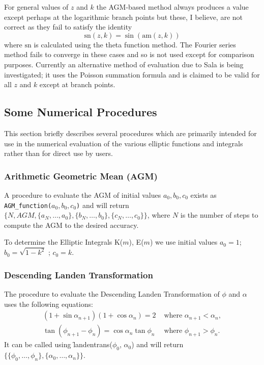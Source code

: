 For general values of $z$ and $k$ the AGM-based method always produces a value
except perhaps at the logarithmic branch points but these, I believe, are
not correct as they fail to satisfy the identity
\[\mathrm{sn}(z,k) = \sin(\mathrm{am}(z,k)) \]
where $\mathrm{sn}$ is calculated using the theta function method. The Fourier
series method fails to converge in these cases and so is not used except for
comparison purposes.  Currently an alternative method of evaluation due to
Sala is being investigated; it uses the Poisson summation formula and is claimed
to be valid for all $z$ and $k$ except at branch points.

\subsection{Some Numerical Procedures}
This section briefly describes several procedures which are primarily
intended for use in the numerical evaluation of the various elliptic
functions and integrals rather than for direct use by users.

\subsubsection{Arithmetic Geometric Mean (AGM)}
\hypertarget{operator:AGM_FUNCTION}{}
A procedure to evaluate the AGM of initial values \(a_0,b_0,c_0\)
exists as \\
\texttt{AGM\_function(\(a_0,b_0,c_0\))} and will return \\
$\{ N, AGM, \{ a_N, \ldots ,a_0\}, \{ b_N, \ldots ,b_0\},
\{c_N, \ldots ,c_0\}\}$,
where $N$ is the number of steps to compute the AGM to the
desired accuracy.

To determine the Elliptic Integrals K($m$), E($m$) we use initial values
\(a_0 = 1\); \(b_0 = \sqrt{1-k^2}\) ; \(c_0 = k\).

\subsubsection{Descending Landen Transformation}
The procedure to evaluate the Descending Landen Transformation of
$\phi$ and $\alpha$ uses the following equations:
\begin{align*}
 (1+\sin \alpha_{n+1})(1+\cos \alpha_n)=2 &\text{ where } \alpha_{n+1}<\alpha_n, \\
  \tan(\phi_{n+1}-\phi_n)=\cos \alpha_n \tan \phi_n & \text{ where } \phi_{n+1}>\phi_n.
\end{align*}
It can be called using \f{landentrans}($\phi_0$, $\alpha_0$)
and will return \\
$\{\{\phi_0, \ldots ,\phi_n\},\{\alpha_0, \ldots ,\alpha_n\}\}$.


